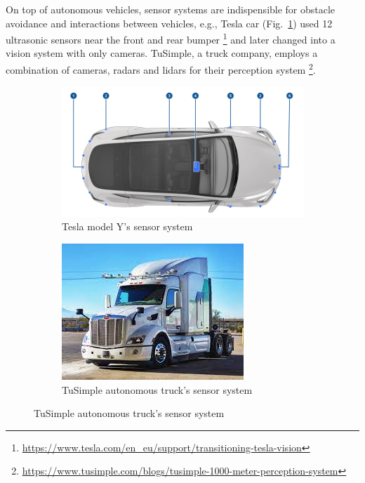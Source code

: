 On top of autonomous vehicles, sensor systems are indispensible for obstacle avoidance and interactions between vehicles, 
e.g., Tesla car (Fig.~\ref{fig:intro_tesla}) used 12 ultrasonic sensors 
near the front and rear bumper \footnote{\url{https://www.tesla.com/en_eu/support/transitioning-tesla-vision}}
and later changed into a vision system with only cameras. 
TuSimple, a truck company, employs a combination of cameras, radars and lidars 
for their perception system \footnote{\url{https://www.tusimple.com/blogs/tusimple-1000-meter-perception-system}}. 

\begin{figure}[ht] 
    \centering 

    \begin{subfigure}[b]{0.49\textwidth} 
        \includegraphics[width=\textwidth]{figures/tesla.png} 
        \caption{Tesla model Y's sensor system} 
        \label{fig:intro_tesla} 
    \end{subfigure} 
    \begin{subfigure}[b]{0.3\textwidth} 
        \includegraphics[width=\textwidth]{figures/truck_cam.jpeg} 
        \caption{TuSimple autonomous truck's sensor system} 
        \label{fig:intro_truckcam} 
    \end{subfigure} 
    
\end{figure} 

